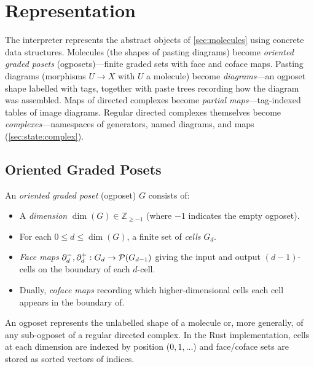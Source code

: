\documentclass[acmsmall,screen,nonacm]{acmart}
\begin{document}
\section{Representation}
\label{sec:data}

The interpreter represents the abstract objects of
\cref{sec:molecules} using concrete data structures.  Molecules (the
shapes of pasting diagrams) become \emph{oriented graded posets}
(ogposets)---finite graded sets with face and coface maps.  Pasting
diagrams (morphisms $U \to X$ with $U$ a molecule) become
\emph{diagrams}---an ogposet shape labelled with tags, together with
paste trees recording how the diagram was assembled.  Maps of directed
complexes become \emph{partial maps}---tag-indexed tables of image
diagrams.  Regular directed complexes themselves become
\emph{complexes}---namespaces of generators, named diagrams, and maps
(\cref{sec:state:complex}).

\subsection{Oriented Graded Posets}
\label{sec:data:ogposet}

An \emph{oriented graded poset} (ogposet) $G$ consists of:
\begin{itemize}
  \item A \emph{dimension} $\dim(G) \in \mathbb{Z}_{\geq -1}$
    (where $-1$ indicates the empty ogposet).
  \item For each $0 \leq d \leq \dim(G)$, a finite set of
    \emph{cells} $G_d$.
  \item \emph{Face maps}
    $\partial^{-}_{d}, \partial^{+}_{d} : G_d \to \mathcal{P}(G_{d-1})$
    giving the input and output $(d{-}1)$-cells on the boundary
    of each $d$-cell.
  \item Dually, \emph{coface maps}
    recording which higher-dimensional cells each cell
    appears in the boundary of.
\end{itemize}
An ogposet represents the unlabelled shape of a molecule or, more
generally, of any sub-ogposet of a regular directed complex.  In the
Rust implementation, cells at each dimension are indexed by position
($0, 1, \ldots$) and face/coface sets are stored as sorted vectors of
indices.
\end{document}
